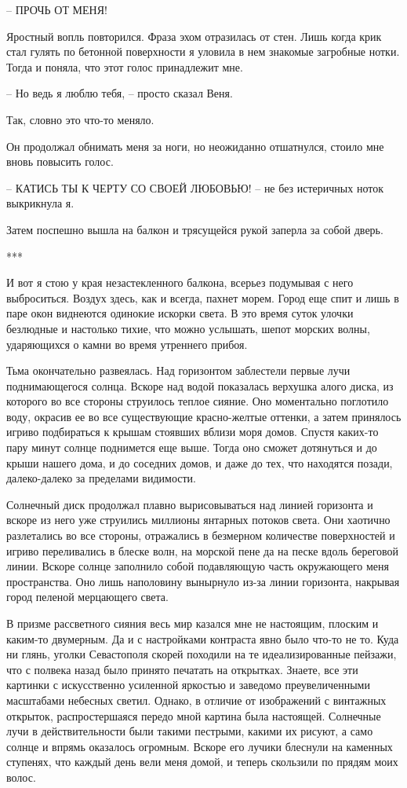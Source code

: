 \documentclass[
]{book}
\begin{document}
-- ПРОЧЬ ОТ МЕНЯ!

Яростный вопль повторился. Фраза эхом отразилась от стен. Лишь когда крик стал гулять по бетонной поверхности я уловила в нем знакомые загробные нотки. Тогда и поняла, что этот голос принадлежит мне.

-- Но ведь я люблю тебя, -- просто сказал Веня.

Так, словно это что-то меняло.

Он продолжал обнимать меня за ноги, но неожиданно отшатнулся, стоило мне вновь повысить голос.

-- КАТИСЬ ТЫ К ЧЕРТУ СО СВОЕЙ ЛЮБОВЬЮ! -- не без истеричных ноток выкрикнула я.

Затем поспешно вышла на балкон и трясущейся рукой заперла за собой дверь.

***

И вот я стою у края незастекленного балкона, всерьез подумывая с него выброситься. Воздух здесь, как и всегда, пахнет морем. Город еще спит и лишь в паре окон виднеются одинокие искорки света. В это время суток улочки безлюдные и настолько тихие, что можно услышать, шепот морских волны, ударяющихся о камни во время утреннего прибоя.

Тьма окончательно развеялась. Над горизонтом заблестели первые лучи поднимающегося солнца. Вскоре над водой показалась верхушка алого диска, из которого во все стороны струилось теплое сияние. Оно моментально поглотило воду, окрасив ее во все существующие красно-желтые оттенки, а затем принялось игриво подбираться к крышам стоявших вблизи моря домов. Спустя каких-то пару минут солнце поднимется еще выше. Тогда оно сможет дотянуться и до крыши нашего дома, и до соседних домов, и даже до тех, что находятся позади, далеко-далеко за пределами видимости.

Солнечный диск продолжал плавно вырисовываться над линией горизонта и вскоре из него уже струились миллионы янтарных потоков света. Они хаотично разлетались во все стороны, отражались в безмерном количестве поверхностей и игриво переливались в блеске волн, на морской пене да на песке вдоль береговой линии. Вскоре солнце заполнило собой подавляющую часть окружающего меня пространства. Оно лишь наполовину вынырнуло из-за линии горизонта, накрывая город пеленой мерцающего света.

В призме рассветного сияния весь мир казался мне не настоящим, плоским и каким-то двумерным. Да и с настройками контраста явно было что-то не то. Куда ни глянь, уголки Севастополя скорей походили на те идеализированные пейзажи, что с полвека назад было принято печатать на открытках. Знаете, все эти картинки с искусственно усиленной яркостью и заведомо преувеличенными масштабами небесных светил. Однако, в отличие от изображений с винтажных открыток, распростершаяся передо мной картина была настоящей. Солнечные лучи в действительности были такими пестрыми, какими их рисуют, а само солнце и впрямь оказалось огромным. Вскоре его лучики блеснули на каменных ступенях, что каждый день вели меня домой, и теперь скользили по прядям моих волос.
\end{document}

